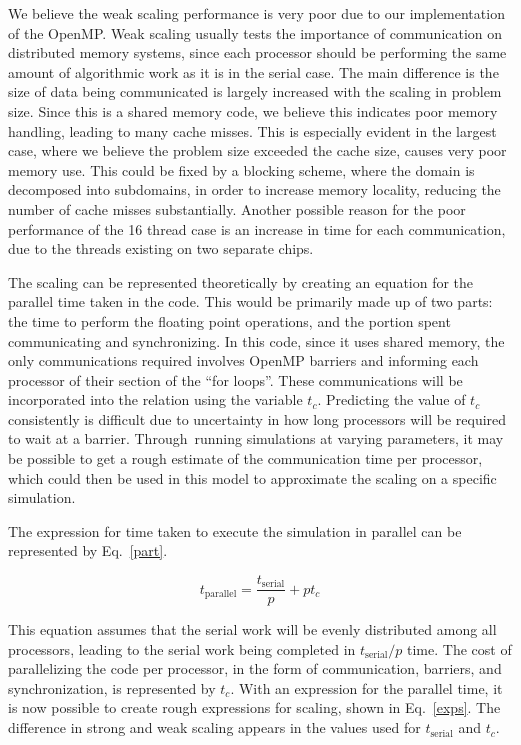 \documentclass[12pt]{article}
\begin{document}
We believe the weak scaling performance is very poor due to our implementation of the OpenMP. Weak scaling usually tests the importance of communication on distributed memory systems, since each processor should be performing the same amount of algorithmic work as it is in the serial case. The main difference is the size of data being communicated is largely increased with the scaling in problem size. Since this is a shared memory code, we believe this indicates poor memory handling, leading to many cache misses. This is especially evident in the largest case, where we believe the problem size exceeded the cache size, causes very poor memory use. This could be fixed by a blocking scheme, where the domain is decomposed into subdomains, in order to increase memory locality, reducing the number of cache misses substantially. Another possible reason for the poor performance of the 16 thread case is an increase in time for each communication, due to the threads existing on two separate chips.

The scaling can be represented theoretically by creating an equation for the parallel time taken in the code. This would be primarily made up of two parts: the time to perform the floating point operations, and the portion spent communicating and synchronizing. In this code, since it uses shared memory, the only communications required involves OpenMP barriers and informing each processor of their section of the ``for loops''. These communications will be incorporated into the relation using the variable $t_c$. Predicting the value of $t_c$ consistently is difficult due to uncertainty in how long processors will be required to wait at a barrier. Through running simulations at varying parameters, it may be possible to get a rough estimate of the communication time per processor, which could then be used in this model to approximate the scaling on a specific simulation. 

The expression for time taken to execute the simulation in parallel can be represented by Eq.~\ref{part}.

\begin{equation}
t_{\mathrm{parallel}} = \frac{t_{\mathrm{serial}}}{p} + p t_c
\label{part}
\end{equation}

This equation assumes that the serial work will be evenly distributed among all processors, leading to the serial work being completed in $t_{\mathrm{serial}}/p$ time. The cost of parallelizing the code per processor, in the form of communication, barriers, and synchronization, is represented by $t_c$. With an expression for the parallel time, it is now possible to create rough expressions for scaling, shown in Eq.~\ref{exps}. The difference in strong and weak scaling appears in the values used for $t_{\mathrm{serial}}$ and $t_c$.
\end{document}

